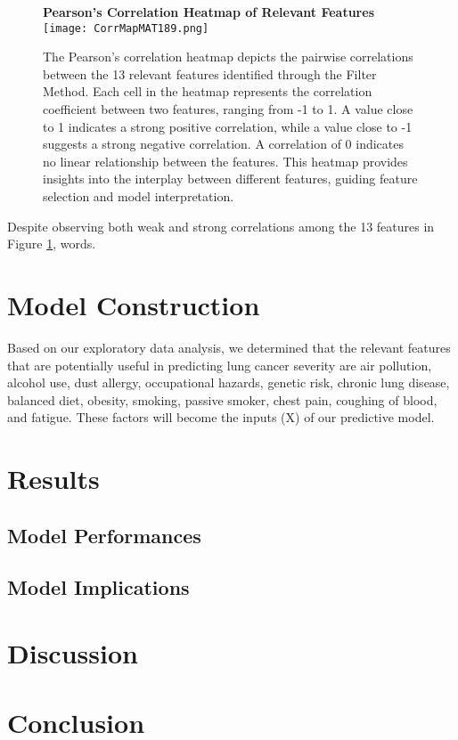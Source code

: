 \documentclass{article}
\begin{document}
\begin{figure}[H]
    \begin{minipage}{1\textwidth}
        \centering
        \textbf{Pearson's Correlation Heatmap of Relevant Features}
        \texttt{[image: CorrMapMAT189.png]}
        \caption{The Pearson's correlation heatmap depicts the pairwise correlations between the 13 relevant features identified through the Filter Method. Each cell in the heatmap represents the correlation coefficient between two features, ranging from -1 to 1. A value close to 1 indicates a strong positive correlation, while a value close to -1 suggests a strong negative correlation. A correlation of 0 indicates no linear relationship between the features. This heatmap provides insights into the interplay between different features, guiding feature selection and model interpretation.}
        \label{heatmap}
    \end{minipage}%
\end{figure}

Despite observing both weak and strong correlations among the 13 features in Figure \ref{heatmap}, words.

\section{Model Construction}
Based on our exploratory data analysis, we determined that the relevant features that are potentially useful in predicting lung cancer severity are air pollution, alcohol use, dust allergy, occupational hazards, genetic risk, chronic lung disease, balanced diet, obesity, smoking, passive smoker, chest pain, coughing of blood, and fatigue. These factors will become the inputs (X) of our predictive model.

\section{Results}
\subsection{Model Performances}


\subsection{Model Implications}

\section{Discussion}

\section{Conclusion}

\printbibliography
\end{document}
